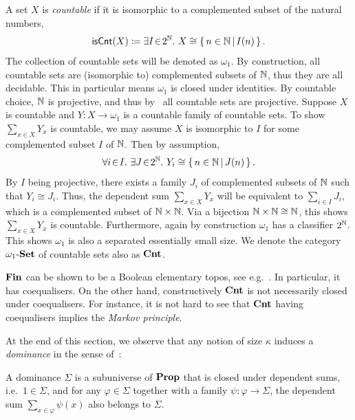 \begin{example}\label{exm:countablesize}
  A set $X$ is \emph{countable} if it is isomorphic to a complemented subset of the natural numbers,
  \[ \mathsf{isCnt}(X) \coloneq \exists I\!\in\!2^{\mathbb{N}}.\  X \cong \left\{\,n\in\mathbb{N}\,\middle|\,I(n)\,\right\}. \]
  The collection of countable sets will be denoted as $\omega_1$. By construction, all countable sets are (isomorphic to) complemented subsets of $\mathbb{N}$, thus they are all decidable. This in particular means $\omega_1$ is closed under identities. By countable choice, $\mathbb{N}$ is projective, and thus by~ all countable sets are projective. Suppose $X$ is countable and $Y \colon X \to \omega_1$ is a countable family of countable sets. To show $\sum_{x\in X}Y_x$ is countable, we may assume $X$ is isomorphic to $I$ for some complemented subset $I$ of $\mathbb{N}$. Then by assumption, 
  \[ \forall i\!\in\!I.\ \exists J\!\in\!2^{\mathbb{N}}.\  Y_i \cong \left\{\,n\in\mathbb{N}\,\middle|\,J(n)\,\right\}. \] 
  By $I$ being projective, there exists a family $J_i$ of complemented subsets of $\mathbb{N}$ such that $Y_i \cong J_i$. Thus, the dependent sum $\sum_{x\in X}Y_x$ will be equivalent to $\sum_{i\in I}J_i$, which is a complemented subset of $\mathbb{N} \times \mathbb{N}$. Via a bijection $\mathbb{N} \times \mathbb{N} \cong \mathbb{N}$, this shows $\sum_{x\in X}Y_x$ is countable. Furthermore, again by construction $\omega_1$ has a classifier $2^{\mathbb{N}}$. This shows $\omega_1$ is also a separated essentially small size. We denote the category $\omega_1\text{-}\mathbf{Set}$ of countable sets also as $\mathbf{Cnt}$.
\end{example}

\begin{remark}\label{rem:coequalisercntandmarkov}
  $\mathbf{Fin}$ can be shown to be a Boolean elementary topos, see e.g.~\citet[D5.2]{johnstone2002sketches}. In particular, it has coequalisers. On the other hand, constructively $\mathbf{Cnt}$ is not necessarily closed under coequalisers. For instance, it is not hard to see that $\mathbf{Cnt}$ having coequalisers implies the \emph{Markov principle}.
\end{remark}

At the end of this section, we observe that any notion of size $\kappa$ induces a \emph{dominance} in the sense of~\citet{rosolini1986continuity}:

\begin{definition}[Dominance]\label{def:dominance}
  A dominance $\Sigma$ is a subuniverse of $\mathbf{Prop}$ that is closed under dependent sums, i.e.\ $1\in\Sigma$, and for any $\varphi\in\Sigma$ together with a family $\psi \colon \varphi \to \Sigma$, the dependent sum $\sum_{x\in\varphi}\psi(x)$ also belongs to $\Sigma$.
\end{definition}

